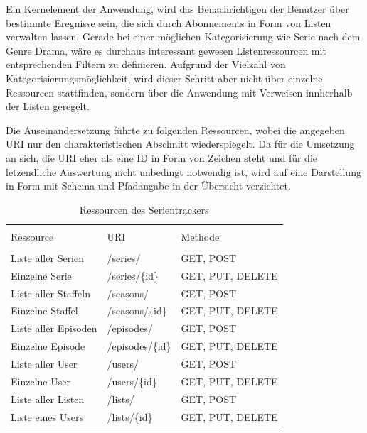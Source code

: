\documentclass[a4paper]{article}
\begin{document}
Ein Kernelement der Anwendung, wird das Benachrichtigen der Benutzer über bestimmte Eregnisse sein, die sich durch Abonnements in Form von Listen verwalten lassen. Gerade bei einer möglichen Kategorisierung wie Serie nach dem Genre Drama, wäre es durchaus interessant gewesen Listenressourcen mit entsprechenden Filtern zu definieren. Aufgrund der Vielzahl von Kategorisierungsmöglichkeit, wird dieser Schritt aber nicht über einzelne Ressourcen stattfinden, sondern über die Anwendung mit Verweisen innherhalb der Listen geregelt.

\newpage

Die Auseinandersetzung führte zu folgenden Ressourcen, wobei die angegeben URI nur den charakteristischen Abschnitt wiederspiegelt.
Da für die Umsetzung an sich, die URI eher als eine ID in Form von Zeichen steht und für die letzendliche Auswertung nicht unbedingt notwendig ist, wird auf eine Darstellung in Form mit Schema und Pfadangabe in der Übersicht verzichtet.


\begin{table}[H]
\caption{Ressourcen des Serientrackers}

\centering
\begin{tabular}{l l l}
\\ [-0.5ex]

\hline\hline
\\ [-0.5ex]
Ressource & URI & Methode
\\ [1.5ex]
\hline
\\ [-0.5ex]
Liste aller Serien & /series/ & GET, POST \\[1ex]
Einzelne Serie & /series/\{id\} & GET, PUT, DELETE\\[1ex]
Liste aller Staffeln & /seasons/ & GET, POST \\[1ex]
Einzelne Staffel & /seasons/\{id\} & GET, PUT, DELETE\\[1ex]
Liste aller Episoden & /episodes/ & GET, POST \\[1ex]
Einzelne Episode & /episodes/\{id\} & GET, PUT, DELETE\\[1ex]
Liste aller User & /users/ & GET, POST \\[1ex]
Einzelne User & /users/\{id\} & GET, PUT, DELETE\\[1ex]
Liste aller Listen & /lists/ & GET, POST\\[1ex]
Liste eines Users & /lists/\{id\} & GET, PUT, DELETE\\[1ex]
\hline
\end{tabular}
\label{tab:ressourcendesserientrackers}
\end{table}
\end{document}
